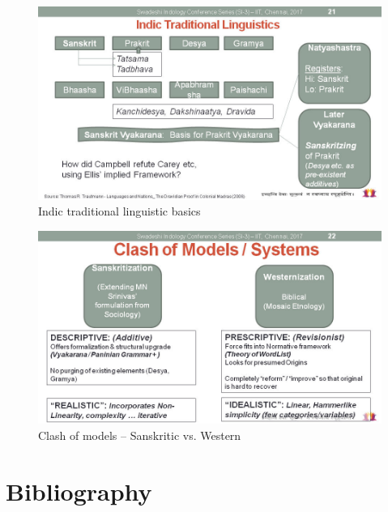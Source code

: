 \begin{figure}[!htbp]
\includegraphics[scale=0.29]{"images/article-02/art02-fig02.jpg"}
\caption{Indic traditional linguistic basics}\label{art2-fig02}
\end{figure}


\begin{figure}[!htbp]
\includegraphics[scale=0.3]{"images/article-02/art02-fig03.jpg"}
\caption{Clash of models – Sanskritic vs. Western}\label{art2-fig03}
\end{figure}


\section*{Bibliography}

